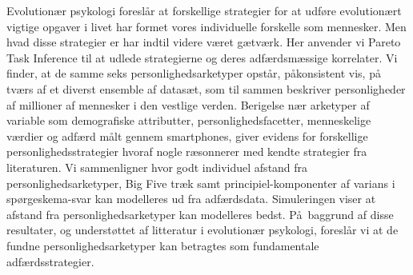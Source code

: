 Evolution\ae r psykologi foresl\aa r at forskellige strategier for at udf\o re evolution\ae rt vigtige opgaver i livet har formet vores individuelle forskelle som mennesker. Men hvad disse strategier er har indtil videre v\ae ret g\ae tv\ae rk. Her anvender vi Pareto Task Inference til at udlede strategierne og deres adf\ae rdsm\ae ssige korrelater. Vi finder, at de samme seks personlighedsarketyper opst\aa r, p\aa  konsistent vis, p\aa \, tv\ae rs af et diverst ensemble af datas\ae t, som til sammen beskriver personligheder af millioner af mennesker i den vestlige verden. Berigelse n\ae r arketyper af variable som demografiske attributter, personlighedsfacetter, menneskelige v\ae rdier og adf\ae rd m\aa lt gennem smartphones, giver evidens for forskellige personlighedsstrategier hvoraf nogle r\ae sonnerer med kendte strategier fra literaturen. Vi sammenligner hvor godt individuel afstand fra personlighedsarketyper, Big Five tr\ae k samt principiel-komponenter af varians i sp\o rgeskema-svar kan modelleres ud fra adf\ae rdsdata. Simuleringen viser at afstand fra personlighedsarketyper kan modelleres bedst. P\aa \, baggrund af disse resultater, og underst\o ttet af litteratur i evolution\ae r psykologi, foresl\aa r vi at de fundne personlighedsarketyper kan betragtes som fundamentale adf\ae rdsstrategier.
